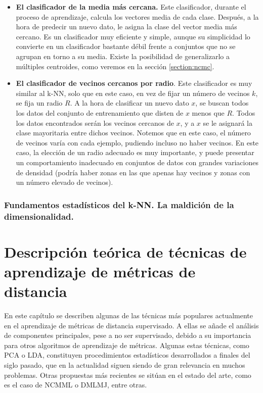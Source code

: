 \documentclass{book}
\begin{document}
\begin{itemize}
	\item \textbf{El clasificador de la media más cercana.} Este clasificador, durante el proceso de aprendizaje, calcula los vectores media de cada clase. Después, a la hora de predecir un nuevo dato, le asigna la clase del vector media más cercano. Es un clasificador muy eficiente y simple, aunque su simplicidad lo convierte en un clasificador bastante débil frente a conjuntos que no se agrupan en torno a su media. Existe la posibilidad de generalizarlo a múltiples centroides, como veremos en la sección \ref{section:ncmc}.

	\item \textbf{El clasificador de vecinos cercanos por radio}. Este clasificador es muy similar al k-NN, solo que en este caso, en vez de fijar un número de vecinos $k$, se fija un radio $R$. A la hora de clasificar un nuevo dato $x$, se buscan todos los datos del conjunto de entrenamiento que disten de $x$ menos que $R$. Todos los datos encontrados serán los vecinos cercanos de $x$, y a $x$ se le asignará la clase mayoritaria entre dichos vecinos. Notemos que en este caso, el número de vecinos varía con cada ejemplo, pudiendo incluso no haber vecinos. En este caso, la elección de un radio adecuado es muy importante, y puede presentar un comportamiento inadecuado en conjuntos de datos con grandes variaciones de densidad (podría haber zonas en las que apenas hay vecinos y zonas con un número elevado de vecinos).


\end{itemize}

\subsection{Fundamentos estadísticos del k-NN. La maldición de la dimensionalidad.}

\chapter{Descripción teórica de técnicas de aprendizaje de métricas de distancia}

En este capítulo se describen algunas de las técnicas más populares actualmente en el aprendizaje de métricas de distancia supervisado. A ellas se añade el análisis de componentes principales, pese a no ser supervisado, debido a su importancia para otros algoritmos de aprendizaje de métricas. Algunas estas técnicas, como PCA o LDA, constituyen procedimientos estadísticos desarrollados a finales del siglo pasado, que en la actualidad siguen siendo de gran relevancia en muchos problemas. Otras propuestas más recientes se sitúan en el estado del arte, como es el caso de NCMML o DMLMJ, entre otras.
\end{document}
